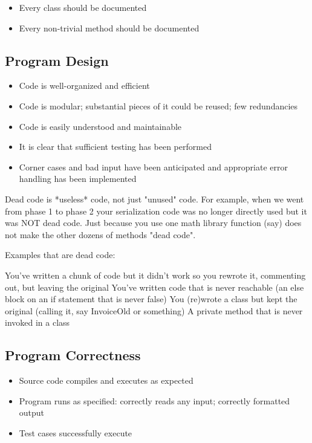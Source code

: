 \documentclass[12pt]{scrartcl}
\begin{document}
\begin{itemize}
  \item Every class should be documented
  \item Every non-trivial method should be documented
\end{itemize}

\subsection*{Program Design}
\begin{itemize}
  \item Code is well-organized and efficient
  \item Code is modular; substantial pieces of it could be reused; few redundancies
  \item Code is easily understood and maintainable
  \item It is clear that sufficient testing has been performed
  \item Corner cases and bad input have been anticipated and appropriate error handling has been implemented  
\end{itemize}

Dead code is *useless* code, not just "unused" code.  For example, when we went from phase 1 to phase 2 your serialization code was no longer directly used but it was NOT dead code.  Just because you use one math library function (say) does not make the other dozens of methods "dead code".  

Examples that are dead code:

You've written a chunk of code but it didn't work so you rewrote it, commenting out, but leaving the original
You've written code that is never reachable (an else block on an if statement that is never false)
You (re)wrote a class but kept the original (calling it, say InvoiceOld or something)
A private method that is never invoked in a class


\subsection*{Program Correctness}
\begin{itemize}
  \item Source code compiles and executes as expected
  \item Program runs as specified: correctly reads any input; correctly formatted output
  \item Test cases successfully execute
\end{itemize}
\end{document}
